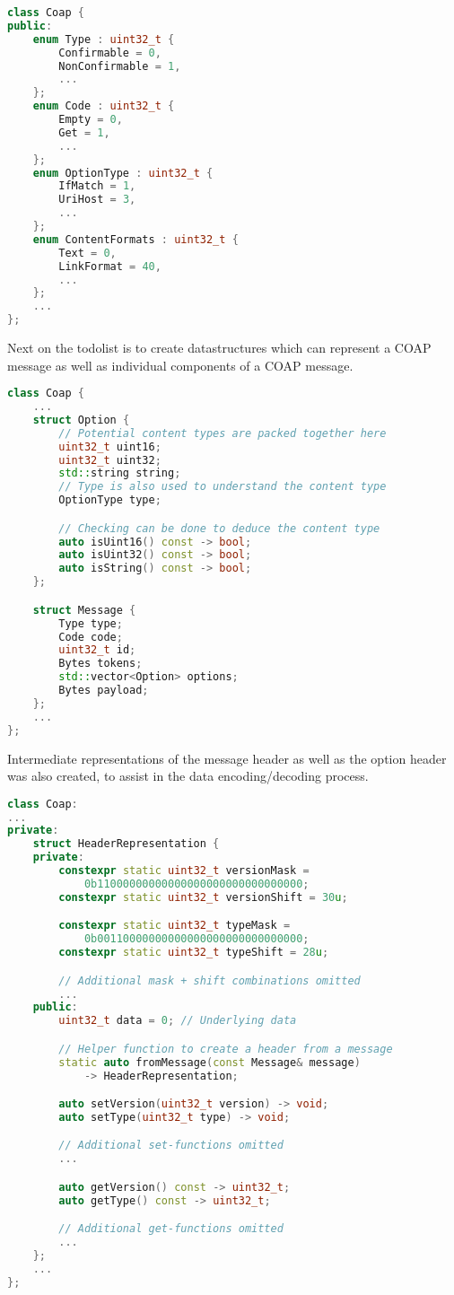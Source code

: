 \documentclass[a4paper, titlepage,12pt]{article}
\begin{document}
	\begin{lstlisting}[language=C++]
class Coap {
public:
	enum Type : uint32_t {
		Confirmable = 0,
		NonConfirmable = 1,
		...
	};
	enum Code : uint32_t {
		Empty = 0,
		Get = 1,
		...
	};
	enum OptionType : uint32_t {
		IfMatch = 1,
		UriHost = 3,
		...
	};
	enum ContentFormats : uint32_t {
		Text = 0,
		LinkFormat = 40,
		...
	};
	...
};
	\end{lstlisting}

			Next on the todolist is to create datastructures which can represent a COAP message as well as individual components of a COAP message.

	\begin{lstlisting}[language=C++]
class Coap {
	...
	struct Option {
		// Potential content types are packed together here
		uint32_t uint16;
		uint32_t uint32;
		std::string string;
		// Type is also used to understand the content type
		OptionType type;

		// Checking can be done to deduce the content type
		auto isUint16() const -> bool;
		auto isUint32() const -> bool;
		auto isString() const -> bool;
	};

	struct Message {
		Type type;
		Code code;
		uint32_t id;
		Bytes tokens;
		std::vector<Option> options;
		Bytes payload;
	};
	...
};
	\end{lstlisting}

			Intermediate representations of the message header as well as the option header was also created, to assist in the data encoding/decoding process.

	\begin{lstlisting}[language=C++]
class Coap:
...
private:
	struct HeaderRepresentation {
	private:
		constexpr static uint32_t versionMask = 
			0b11000000000000000000000000000000;
		constexpr static uint32_t versionShift = 30u;

		constexpr static uint32_t typeMask = 
			0b00110000000000000000000000000000;
		constexpr static uint32_t typeShift = 28u;

		// Additional mask + shift combinations omitted
		...
	public:
		uint32_t data = 0; // Underlying data

		// Helper function to create a header from a message
		static auto fromMessage(const Message& message) 
			-> HeaderRepresentation;

		auto setVersion(uint32_t version) -> void;
		auto setType(uint32_t type) -> void;

		// Additional set-functions omitted
		...

		auto getVersion() const -> uint32_t;
		auto getType() const -> uint32_t;

		// Additional get-functions omitted
		...
	};
	...
};
	\end{lstlisting}
\end{document}
